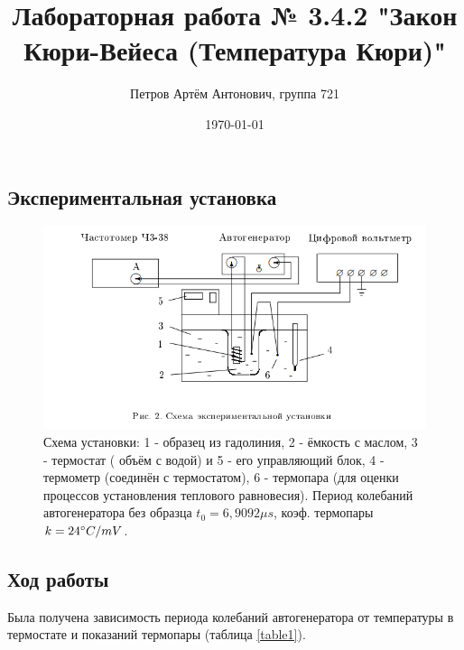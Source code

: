 \documentclass[a4paper,12pt]{article}
\author{Петров Артём Антонович, группа 721}
\title{Лабораторная работа № 3.4.2 "Закон Кюри-Вейеса (Температура Кюри)"}
\date{\today}
\begin{document}

\begin{minipage}[t][5cm]{\textwidth}
\maketitle
\end{minipage}

%
%
%


\bigskip

\subsection*{Экспериментальная установка}
\bigskip


\begin{figure}[ht]
\centering
\includegraphics[width=160mm]{scheme.png}
\caption{Схема установки: 1 - образец из гадолиния, 2 - ёмкость с маслом, 3 - термостат ( объём с водой) и 5 - его управляющий блок, 4 - термометр (соединён с термостатом), 6 - термопара (для оценки процессов установления теплового равновесия). Период колебаний автогенератора без образца $t_0 = 6,9092\mu s$, коэф. термопары $k=24 \degree C/mV$.}
\label{schema}
\end{figure}

\bigskip

\subsection*{Ход работы}
\bigskip

Была получена зависимость периода колебаний автогенератора от температуры в термостате и показаний термопары (таблица \ref{table1}).
\end{document}
